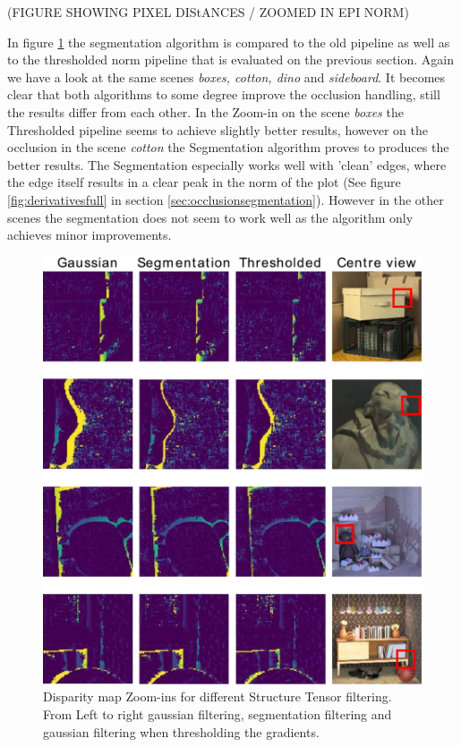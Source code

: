 \documentclass  [
  paper    = a4,
  BCOR     = 10mm,
  twoside,
  fontsize = 12pt,
  fleqn,
  toc      = bibnumbered,
  toc      = listofnumbered,
  numbers  = noendperiod,
  headings = normal,
  listof   = leveldown,
  version  = 3.03
]                                       {scrreprt}
\begin{document}
(FIGURE SHOWING PIXEL DIStANCES / ZOOMED IN EPI NORM)

In figure \ref{fig:threshresultsmorph} the segmentation algorithm is compared to the old pipeline as well as to the thresholded norm pipeline that is evaluated on the previous section. Again we have a look at the same scenes \textit{boxes, cotton, dino} and \textit{sideboard}. It becomes clear that both algorithms to some degree improve the occlusion handling, still the results differ from each other. In the Zoom-in on the scene \textit{boxes} the Thresholded pipeline seems to achieve slightly better results, however on the occlusion in the scene \textit{cotton} the Segmentation algorithm proves to produces the better results. The Segmentation especially works well with 'clean' edges, where the edge itself results in a clear peak in the norm of the plot (See figure \ref{fig:derivativesfull} in section \ref{sec:occlusionsegmentation}). However in the other scenes the segmentation does not seem to work well as the algorithm only achieves minor improvements.


\begin{figure}
	\centering
	\includegraphics[width=1\linewidth]{images/thresh_results_morph-eps-converted-to.pdf}
	\caption[Disparity map Zoom-ins for different methods]{Disparity map Zoom-ins for different Structure Tensor filtering. From Left to right gaussian filtering, segmentation filtering and gaussian filtering when thresholding the gradients.}
	\label{fig:threshresultsmorph}
\end{figure}
\end{document}
